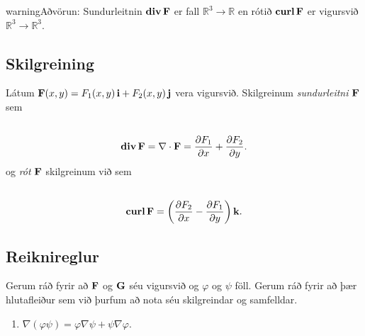 \documentclass[a4paper,10pt,icelandic]{sphinxmanual}
\begin{document}
\begin{notice}{warning}{Aðvörun:}
Sundurleitnin \(\mbox{${\rm\bf div\,}$}\mbox{${\bf F}$}\) er fall \({\mathbb  R}^3\rightarrow{\mathbb  R}\) en rótið \(\mbox{${\rm\bf curl\,}$}\mbox{${\bf F}$}\) er vigursvið \({\mathbb  R}^3\rightarrow{\mathbb  R}^3\).
\end{notice}


\subsection{Skilgreining}
\label{Kafli6:id2}
Látum
\(\mbox{${\bf F}$}(x,y)=F_1(x,y)\,\mbox{${\bf i}$}+F_2(x,y)\,\mbox{${\bf j}$}\)
vera vigursvið. Skilgreinum \emph{sundurleitni} \(\mbox{${\bf F}$}\) sem
\begin{gather}
\begin{split}\displaystyle\end{split}\notag\\\begin{split}\mbox{${\rm\bf div\,}$}\mbox{${\bf F}$}=\nabla\cdot\mbox{${\bf F}$}=\frac{\partial F_1}{\partial
  x}+\frac{\partial F_2}{\partial y}.\end{split}\notag
\end{gather}
og \emph{rót} \(\mbox{${\bf F}$}\) skilgreinum við sem
\begin{gather}
\begin{split}\displaystyle\end{split}\notag\\\begin{split}\mbox{${\rm\bf curl\,}$}\mbox{${\bf F}$}=\bigg(\frac{\partial F_2}{\partial x}-\frac{\partial
  F_1}{\partial y}\bigg)\,\mbox{${\bf k}$}.\end{split}\notag
\end{gather}

\subsection{Reiknireglur}
\label{Kafli6:reiknireglur}
Gerum ráð fyrir að \(\mbox{${\bf F}$}\) og \(\mbox{${\bf G}$}\)
séu vigursvið og \(\varphi\) og \(\psi\) föll. Gerum ráð fyrir
að þær hlutafleiður sem við þurfum að nota séu skilgreindar og
samfelldar.
\begin{enumerate}
\item {} 
\(\nabla(\varphi\psi)=\varphi\nabla\psi+\psi\nabla\varphi\).

\end{enumerate}
\end{document}
